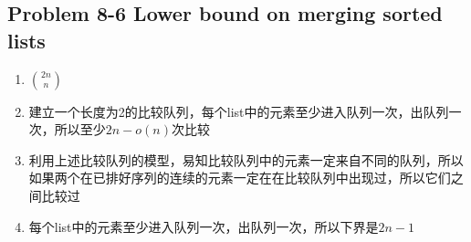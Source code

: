 \subsection*{Problem 8-6 Lower bound on merging sorted lists}
\begin{enumerate}
	\item	$\binom{2n}{n}$
	\item	建立一个长度为2的比较队列，每个list中的元素至少进入队列一次，出队列一次，所以至少$2n - o(n)$次比较
	\item	利用上述比较队列的模型，易知比较队列中的元素一定来自不同的队列，所以如果两个在已排好序列的连续的元素一定在在比较队列中出现过，所以它们之间比较过
	\item	每个list中的元素至少进入队列一次，出队列一次，所以下界是$2n - 1$
\end{enumerate}

